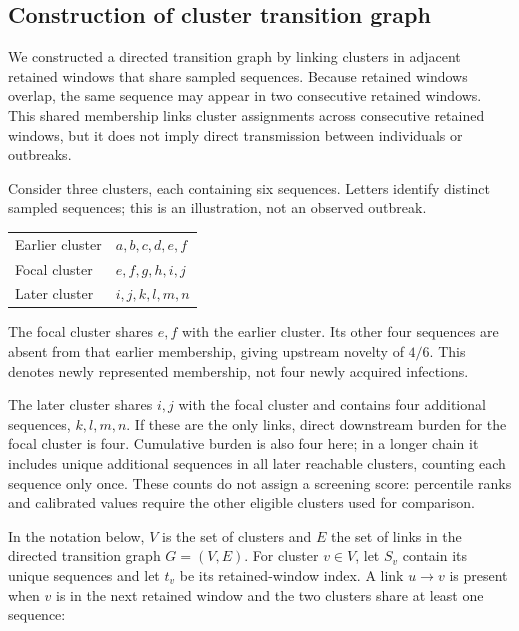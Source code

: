 \subsection{Construction of cluster transition graph}\label{sec:ch5_transition_graph}

We constructed a directed transition graph by linking clusters in adjacent retained windows that share sampled sequences. Because retained windows overlap, the same sequence may appear in two consecutive retained windows. This shared membership links cluster assignments across consecutive retained windows, but it does not imply direct transmission between individuals or outbreaks.

\begin{tcolorbox}[title=Illustrative example: three successive windows,fontupper=\small]
Consider three clusters, each containing six sequences. Letters identify distinct sampled sequences; this is an illustration, not an observed outbreak.
\begin{center}
\begin{tabular}{@{}ll@{}}
Earlier cluster & $a,b,c,d,e,f$ \\
Focal cluster & $e,f,g,h,i,j$ \\
Later cluster & $i,j,k,l,m,n$ \\
\end{tabular}
\end{center}
The focal cluster shares $e,f$ with the earlier cluster. Its other four sequences are absent from that earlier membership, giving upstream novelty of $4/6$. This denotes newly represented membership, not four newly acquired infections.

The later cluster shares $i,j$ with the focal cluster and contains four additional sequences, $k,l,m,n$. If these are the only links, direct downstream burden for the focal cluster is four. Cumulative burden is also four here; in a longer chain it includes unique additional sequences in all later reachable clusters, counting each sequence only once. These counts do not assign a screening score: percentile ranks and calibrated values require the other eligible clusters used for comparison.
\end{tcolorbox}

In the notation below, $V$ is the set of clusters and $E$ the set of links in the directed transition graph $G=(V,E)$. For cluster $v \in V$, let $S_v$ contain its unique sequences and let $t_v$ be its retained-window index. A link $u \rightarrow v$ is present when $v$ is in the next retained window and the two clusters share at least one sequence:

